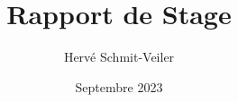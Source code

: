\documentclass{report}
\title{\Huge{Rapport de Stage}}
\author{Hervé Schmit-Veiler}
\date{Septembre 2023}
\begin{document}
\maketitle

\tableofcontents

\begingroup

\endgroup

\begingroup
\let\clearpage\relax

\endgroup

\begingroup
\let\clearpage\relax

\endgroup

\begingroup
\let\clearpage\relax

\endgroup

\begingroup
\let\clearpage\relax

\endgroup

\printbibliography
\end{document}
